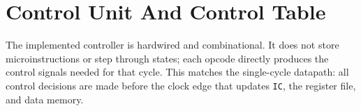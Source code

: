 \documentclass[12pt,a4paper]{article}
\begin{document}
\section{Control Unit And Control Table}

The implemented controller is hardwired and combinational. It does not store microinstructions or step through states; each opcode directly produces the control signals needed for that cycle. This matches the single-cycle datapath: all control decisions are made before the clock edge that updates \texttt{IC}, the register file, and data memory.

\begin{table}[H]
\centering
\scriptsize
\caption{Verilog control table extracted from the implemented controller. \texttt{X} indicates a don't-care value because the destination path is disabled or unused.}
\end{table}
\end{document}
